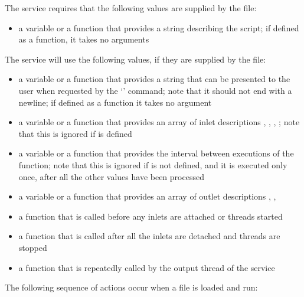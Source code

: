 \secondaryEnd
\condPage
{}
The \CLF{} service requires that the following values are supplied by the \CL{} file:
\begin{itemize}
\item\textbf{} \longDash{} a variable or a function that
provides a string describing the script; if defined as a function, it takes no arguments
\end{itemize}
\secondaryEnd
{}
The \CLF{} service will use the following values, if they are supplied by the \CL{} file:
\begin{itemize}
\item\textbf{} \longDash{} a variable or a function that provides a
string that can be presented to the user when requested by the `' command; note
that it should not end with a newline; if defined as a function it takes no argument
\item\exSp\textbf{} \longDash{} a variable or a function that
provides an array of inlet descriptions \openSq{}, ,
, \closeSq; note that this is ignored if
 is defined
\item\exSp\textbf{} \longDash{} a variable or a function that
provides the interval between executions of the  function; note that
this is ignored if  is not defined, and it is executed only once,
after all the other values have been processed
\item\exSp\textbf{} \longDash{} a variable or a function that
provides an array of outlet descriptions \openSq{}, ,
\closeSq
\item\exSp\textbf{} \longDash{} a function that is called before
any inlets are attached or threads started
\item\exSp\textbf{} \longDash{} a function that is called after all
the inlets are detached and threads are stopped
\item\exSp\textbf{} \longDash{} a function that is repeatedly
called by the output thread of the service
\end{itemize}
\secondaryEnd
\condPage
{}
The following sequence of actions occur when a \CL{} file is loaded and run:
